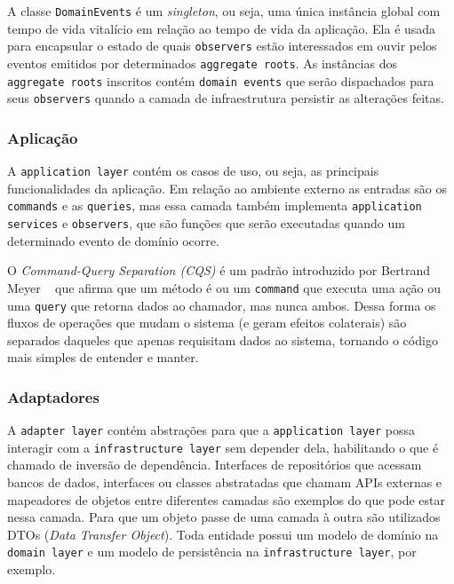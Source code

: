 \FloatBarrier

A classe \texttt{DomainEvents} é um \emph{singleton}, ou seja, uma única instância global com tempo de vida vitalício em relação ao tempo de vida da aplicação. Ela é usada para encapsular o estado de quais \texttt{observers} estão interessados em ouvir pelos eventos emitidos por determinados \texttt{aggregate roots}. As instâncias dos \texttt{aggregate roots} inscritos contém \texttt{domain events} que serão dispachados para seus \texttt{observers} quando a camada de infraestrutura persistir as alterações feitas.

\subsubsection{Aplicação}

A \texttt{application layer} contém os casos de uso, ou seja, as principais funcionalidades da aplicação. Em relação ao ambiente externo as entradas são os \texttt{commands} e as \texttt{queries}, mas essa camada também implementa \texttt{application services} e \texttt{observers}, que são funções que serão executadas quando um determinado evento de domínio ocorre.

O \emph{Command-Query Separation (CQS)} é um padrão introduzido por Bertrand Meyer ~\cite{object-oriented-software-construction} que afirma que um método é ou um \texttt{command} que executa uma ação ou uma \texttt{query} que retorna dados ao chamador, mas nunca ambos. Dessa forma os fluxos de operações que mudam o sistema (e geram efeitos colaterais) são separados daqueles que apenas requisitam dados ao sistema, tornando o código mais simples de entender e manter.

\subsubsection{Adaptadores}

A \texttt{adapter layer} contém abstrações para que a \texttt{application layer} possa interagir com a \texttt{infrastructure layer} sem depender dela, habilitando o que é chamado de inversão de dependência. Interfaces de repositórios que acessam bancos de dados, interfaces ou classes abstratadas que chamam APIs externas e mapeadores de objetos entre diferentes camadas são exemplos do que pode estar nessa camada. Para que um objeto passe de uma camada à outra são utilizados DTOs (\emph{Data Transfer Object}). Toda entidade possui um modelo de domínio na \texttt{domain layer} e um modelo de persistência na \texttt{infrastructure layer}, por exemplo.

